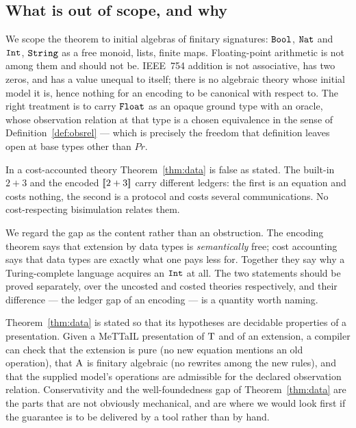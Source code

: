 \documentclass{article}
\begin{document}
\subsection{What is out of scope, and why}

\begin{remark}
    We scope the theorem to initial algebras of finitary signatures: $\mathtt{Bool}$, $\mathtt{Nat}$ and $\mathtt{Int}$, $\mathtt{String}$ as a free monoid, lists, finite maps. Floating-point arithmetic is not among them and should not be. IEEE~754 addition is not associative, has two zeros, and has a value unequal to itself; there is no algebraic theory whose initial model it is, hence nothing for an encoding to be canonical with respect to. The right treatment is to carry $\mathtt{Float}$ as an opaque ground type with an oracle, whose observation relation at that type is a chosen equivalence in the sense of Definition~\ref{def:obsrel} --- which is precisely the freedom that definition leaves open at base types other than $Pr$.
\end{remark}

\begin{remark}[cost]
\label{rem:cost}
    In a cost-accounted theory Theorem~\ref{thm:data} is false as stated. The built-in $2+3$ and the encoded $[\![2+3]\!]$ carry different ledgers: the first is an equation and costs nothing, the second is a protocol and costs several communications. No cost-respecting bisimulation relates them.

    We regard the gap as the content rather than an obstruction. The encoding theorem says that extension by data types is \emph{semantically} free; cost accounting says that data types are exactly what one pays less for. Together they say why a Turing-complete language acquires an $\mathtt{Int}$ at all. The two statements should be proved separately, over the uncosted and costed theories respectively, and their difference --- the ledger gap of an encoding --- is a quantity worth naming.
\end{remark}

\begin{remark}
    Theorem~\ref{thm:data} is stated so that its hypotheses are decidable properties of a presentation. Given a MeTTaIL presentation of $\mathrm{T}$ and of an extension, a compiler can check that the extension is pure (no new equation mentions an old operation), that $\mathrm{A}$ is finitary algebraic (no rewrites among the new rules), and that the supplied model's operations are admissible for the declared observation relation. Conservativity and the well-foundedness gap of Theorem~\ref{thm:data} are the parts that are not obviously mechanical, and are where we would look first if the guarantee is to be delivered by a tool rather than by hand.
\end{remark}
\end{document}

